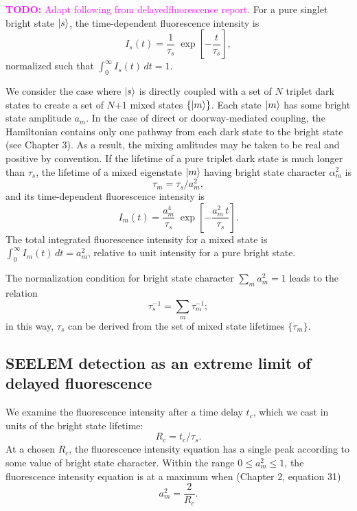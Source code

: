 \documentclass[12pt,draft]{mitthesis}
\newcommand{\TODO} [1]{\textcolor{magenta}{\textbf{TODO:} #1}}
\begin{document}
\TODO{Adapt following from delayedfluorescence report.}  For a pure
singlet bright state $\mathinner{|{s}\rangle}$, the time-dependent fluorescence
intensity is
\begin{equation}
  I_s(t) = \frac{1}{\tau_s} \;
           \exp \left[
             -\frac{t}{ \tau_s} 
           \right],
\end{equation}
normalized such that $\int_0^{\infty} I_s(t) \, dt = 1$.

We consider the case where $\mathinner{|{s}\rangle}$ is directly coupled with a set of
$N$ triplet dark states to create a set of $N$+1 mixed states
$\lbrace\mathinner{|{m}\rangle}\rbrace$.  Each state $\mathinner{|{m}\rangle}$ has some bright state
amplitude $a_m$.  In the case of direct or doorway-mediated coupling,
the Hamiltonian contains only one pathway from each dark state to the
bright state (see Chapter 3).  As a result, the mixing amlitudes may
be taken to be real and positive by convention.  If the lifetime of a
pure triplet dark state is much longer than $\tau_s$, the lifetime of
a mixed eigenstate $\mathinner{|{m}\rangle}$ having bright state character
$\alpha_m^2$ is
\begin{equation}
  \label{eq:tau-m}
  \tau_m = \tau_s / a_m^2,
\end{equation}
and its time-dependent fluorescence intensity is
\begin{equation}
  \label{eq:int-m}
  I_m(t) = \frac{a_m^4}{\tau_s} \;
           \exp \left[
             -\frac{a_m^2 \, t}{\tau_s} 
           \right].
\end{equation}
The total integrated fluorescence intensity for a mixed state is
$\int_0^{\infty} I_m(t) \, dt = a_m^2$, relative to unit intensity for
a pure bright state.

The normalization condition for bright state character $\sum_m a_m^2 =
1$ leads to the relation
\begin{equation}
  \tau_s^{-1} = \sum_m \tau_m^{-1};
\end{equation}
in this way, $\tau_s$ can be derived from the set of mixed state
lifetimes $\lbrace \tau_m \rbrace$.

\subsection{SEELEM detection as an extreme limit of delayed fluorescence}

We examine the fluorescence intensity after a time delay $t_c$,
which we cast in units of the bright state lifetime:
\begin{equation}
  R_c = t_c / \tau_s.
\end{equation}
At a chosen $R_c$, the fluorescence intensity equation has a single
peak according to some value of bright state character.  Within the
range $0 \le a_m^2 \le 1$, the fluorescence intensity equation is at a
maximum when (Chapter 2, equation 31)
\begin{equation}
  \label{eq:am-max}
  a_m^2 = \frac{2}{R_c}.
\end{equation}
\end{document}
